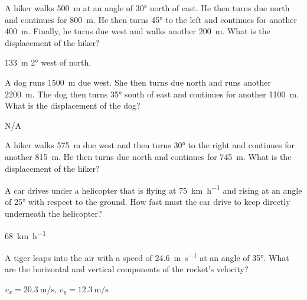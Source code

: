\begin{question}[ID=vectors-B-Q02,topic=vectors,difficulty=B]
    A hiker walks \SI{500}{\meter} at an angle of \ang{30}
        north of east.
    He then turns due north and continues for \SI{800}{\meter}.
    He then turns \ang{45} to the left and continues for
        another \SI{400}{\meter}.
    Finally, he turns due west and walks another \SI{200}{\meter}.
    What is the displacement of the hiker?
\end{question}
\begin{solution}
    \SI{133}{\meter} \ang{2} west of north.
\end{solution}


\begin{question}[ID=vectors-B-Q03,topic=vectors,difficulty=B]
    A dog runs \SI{1500}{\meter} due west.
    She then turns due north and runs another \SI{2200}{\meter}.
    The dog then turns \ang{35} south of east and
        continues for another \SI{1100}{\meter}.
    What is the displacement of the dog?
\end{question}
\begin{solution}
    N/A
\end{solution}


\begin{question}[ID=vectors-B-Q04,topic=vectors,difficulty=B]
    A hiker walks \SI{575}{\meter} due west and then turns
        \ang{30} to the right and continues for another
        \SI{815}{\meter}.
    He then turns due north and continues for \SI{745}{\meter}.
    What is the displacement of the hiker?
\end{question}
\begin{solution}
\end{solution}


\begin{question}[ID=vectors-C-Q01,topic=vectors,difficulty=C]
    A car drives under a helicopter that is flying at
        \SI{75}{\kilo\meter\per\hour} and rising at
        an angle of \ang{25} with respect to the ground.
    How fast must the car drive to keep directly underneath
        the helicopter?
\end{question}
\begin{solution}
    \SI{68}{\kilo\meter\per\hour}
\end{solution}


\begin{question}[ID=vectors-C-Q02,topic=vectors,difficulty=C]
    A tiger leaps into the air with a speed of
        \SI{24.6}{\meter\per\second} at an angle
        of \ang{35}.
    What are the horizontal and vertical components of
        the rocket's velocity?
\end{question}
\begin{solution}
    $v_{x} = \SI{20.3}{\meter\per\second}$,
    $v_{y} = \SI{12.3}{\meter\per\second}$
\end{solution}


